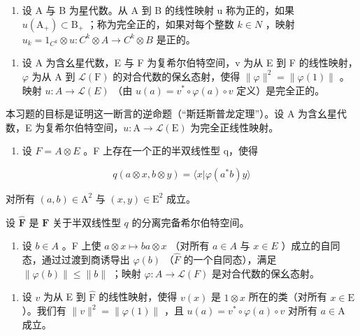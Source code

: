 \begin{enumerate}
\def\labelenumi{\arabic{enumi})}
\setcounter{enumi}{3}
\tightlist
\item
  设 A 与 B 为星代数。从 A 到 B 的线性映射 u 称为正的，如果 \(u(\mathrm{A}_{+}) \subset \mathrm{B}_{+}\) ；称为完全正的，如果对每个整数 \(k \in N\) ，映射 \(u_{k} = 1_{C^{k}} \otimes u: C^{k} \otimes A \to C^{k} \otimes B\) 是正的。
\end{enumerate}

\begin{enumerate}
\def\labelenumi{\alph{enumi})}
\tightlist
\item
  设 A 为含幺星代数，E 与 F 为复希尔伯特空间，v 为从 E 到 F 的线性映射，\(\varphi\) 为从 A 到 \(\mathcal{L}(\mathrm{F})\) 的对合代数的保幺态射，使得 \(\|\varphi\|^{2} = \|\varphi(1)\|\) 。映射 \(u: A \to \mathcal{L}(E)\) （由 \(u(a) = v^{*} \circ \varphi(a) \circ v\) 定义）是完全正的。
\end{enumerate}

本习题的目标是证明这一断言的逆命题（“斯廷斯普龙定理”）。设 A 为含幺星代数，E 为复希尔伯特空间，\(u \colon \mathrm{A} \to \mathcal{L}(\mathrm{E})\) 为完全正线性映射。

\begin{enumerate}
\def\labelenumi{\alph{enumi})}
\setcounter{enumi}{1}
\tightlist
\item
  设 \(F = A \otimes E\) 。F 上存在一个正的半双线性型 q，使得
\end{enumerate}

\[
q (a \otimes x, b \otimes y) = \langle x | \varphi (a ^ {*} b) y \rangle
\]

对所有 \((a,b)\in \mathrm{A}^2\) 与 \((x,y)\in \mathrm{E}^2\) 成立。

设 \(\widehat{\mathbf{F}}\) 是 \(\mathbf{F}\) 关于半双线性型 \(q\) 的分离完备希尔伯特空间。

\begin{enumerate}
\def\labelenumi{\alph{enumi})}
\setcounter{enumi}{2}
\tightlist
\item
  设 \(b \in A\) 。F 上使 \(a \otimes x \mapsto ba \otimes x\) （对所有 \(a \in A\) 与 \(x \in E\) ）成立的自同态，通过过渡到商诱导出 \(\varphi(b)\) （\(\widehat{F}\) 的一个自同态），满足 \(\|\varphi(b)\|\leqslant\|b\|\) ；映射 \(\varphi\colon A\to\mathcal{L}(F)\) 是对合代数的保幺态射。
\end{enumerate}

\begin{enumerate}
\def\labelenumi{\alph{enumi})}
\setcounter{enumi}{3}
\tightlist
\item
  设 \(v\) 为从 E 到 \(\widehat{\mathrm{F}}\) 的线性映射，使得 \(v(x)\) 是 \(1 \otimes x\) 所在的类（对所有 \(x \in \mathrm{E}\) ）。我们有 \(\|v\|^2 = \| \varphi(1)\|\) ，且 \(u(a) = v^* \circ \varphi(a) \circ v\) 对所有 \(a \in \mathrm{A}\) 成立。
\end{enumerate}

